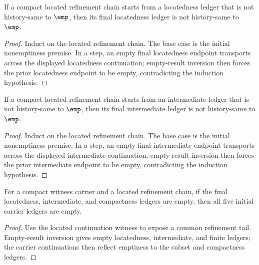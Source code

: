 \begin{theorem}
\label{thm:compact-located-refinement-chain-located-nonempty-forward}
If a compact located refinement chain starts from a locatedness ledger that is
not history-same to \(\emp\), then its final locatedness ledger is not
history-same to \(\emp\).
\end{theorem}
\begin{proof}
Induct on the located refinement chain. The base case is the initial
nonemptiness premise. In a step, an empty final locatedness endpoint transports
across the displayed locatedness continuation; empty-result inversion then
forces the prior locatedness endpoint to be empty, contradicting the induction
hypothesis.
\end{proof}

\begin{theorem}
\label{thm:compact-located-refinement-chain-intermediate-nonempty-forward}
If a compact located refinement chain starts from an intermediate ledger that
is not history-same to \(\emp\), then its final intermediate ledger is not
history-same to \(\emp\).
\end{theorem}
\begin{proof}
Induct on the located refinement chain. The base case is the initial
nonemptiness premise. In a step, an empty final intermediate endpoint
transports across the displayed intermediate continuation; empty-result
inversion then forces the prior intermediate endpoint to be empty, contradicting
the induction hypothesis.
\end{proof}

\begin{theorem}
\label{thm:compact-witness-carrier-located-empty-final-refinement-reflects-empty-initial}
For a compact witness carrier and a located refinement chain, if the final locatedness, intermediate, and compactness ledgers are empty, then all five initial carrier ledgers are empty.
\end{theorem}
\begin{proof}
Use the located continuation witness to expose a common refinement tail. Empty-result inversion gives empty locatedness, intermediate, and finite ledgers; the carrier continuations then reflect emptiness to the subset and compactness ledgers.
\end{proof}

